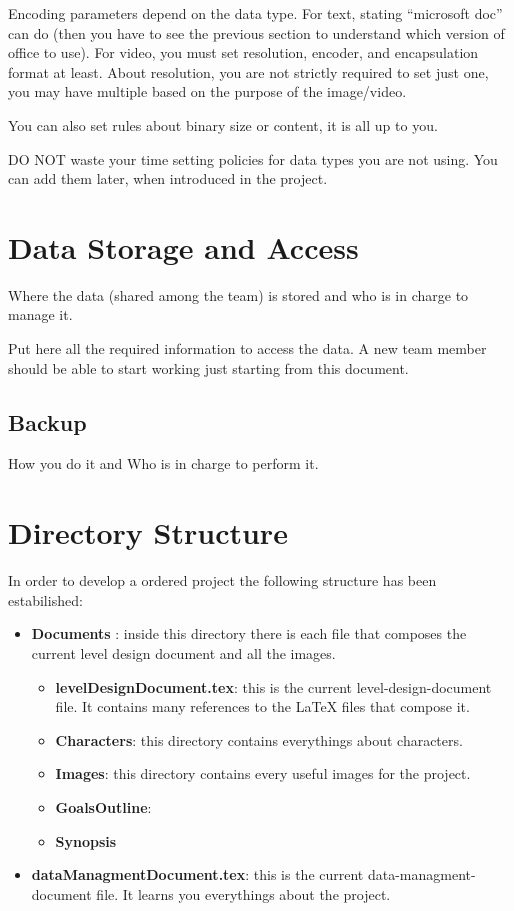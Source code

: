 \documentclass[12pt]{article}
\begin{document}
Encoding parameters depend on the data type. For text, stating “microsoft doc” can do (then you have to see the previous section to understand which version of office to use). For video, you must set resolution, encoder, and encapsulation format at least. About resolution, you are not strictly required to set just one, you may have multiple based on the purpose of the image/video.

You can also set rules about binary size or content, it is all up to you.

DO NOT waste your time setting policies for data types you are not using. You can add them later, when introduced in the project.

\section{Data Storage and Access}
Where the data (shared among the team) is stored and who is in charge to manage it.

Put here all the required information to access the data. A new team member should be able to start working just starting from this document.

\subsection{Backup}
How you do it and Who is in charge to perform it.

\section{Directory Structure}
In order to develop a ordered project the following structure has been estabilished:
\begin{itemize}
\item \textbf{Documents} : inside this directory there is each file that composes the current level design document and all the images.
  \begin{itemize}
    \item \textbf{levelDesignDocument.tex}: this is the current level-design-document file. It contains many references to the LaTeX files that compose it.
    
    \item \textbf{Characters}: this directory contains everythings about characters.
      
    \item \textbf{Images}: this directory contains every useful images for the project.
      
    \item \textbf{GoalsOutline}:
    
    \item \textbf{Synopsis}
  \end{itemize}
  \item \textbf{dataManagmentDocument.tex}: this is the current data-managment-document file. It learns you everythings about the project.
\end{itemize}
\end{document}
